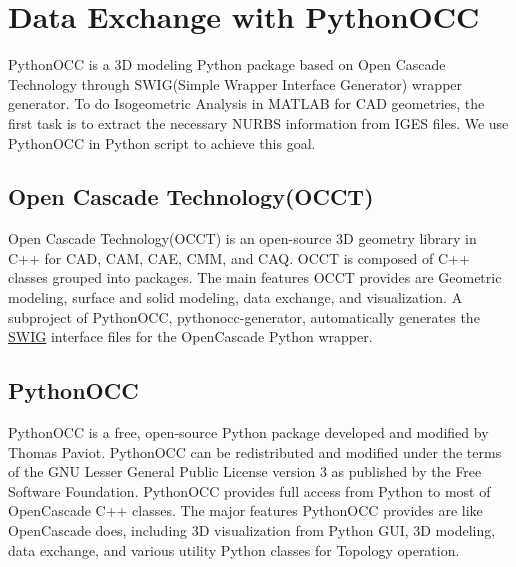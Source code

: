 \documentclass[12pt, a4paper]{report}
\begin{document}
  

\chapter{Data Exchange with PythonOCC} \label{chap:PythonOCC}
PythonOCC is a 3D modeling Python package based on Open Cascade Technology through SWIG(Simple Wrapper Interface Generator) wrapper generator. To do Isogeometric Analysis in MATLAB for CAD geometries, the first task is to extract the necessary NURBS information from IGES files. We use PythonOCC\cite{pythonocc} in Python script to achieve this goal.

\setlength{\parskip}{12pt}
\section{Open Cascade Technology(OCCT)}
Open Cascade Technology(OCCT)\cite{occt} is an open-source 3D geometry library in C++ for CAD, CAM, CAE, CMM, and CAQ. OCCT is composed of C++ classes grouped into packages. The main features OCCT provides are Geometric modeling, surface and solid modeling, data exchange, and visualization. A subproject of PythonOCC, pythonocc-generator\cite{pythonocc-generator}, automatically generates the \href{https://www.swig.org/}{SWIG} interface files for the OpenCascade Python wrapper.

\setlength{\parskip}{12pt}
\section{PythonOCC}
PythonOCC is a free, open-source Python package developed and modified by Thomas Paviot. PythonOCC can be redistributed and modified under the terms of the GNU Lesser General Public License version 3 as published by the Free Software Foundation. PythonOCC provides full access from Python to most of OpenCascade C++ classes. The major features PythonOCC provides are like OpenCascade does, including 3D visualization from Python GUI, 3D modeling, data exchange, and various utility Python classes for Topology operation. 

\setlength{\parskip}{12pt}
\end{document}
